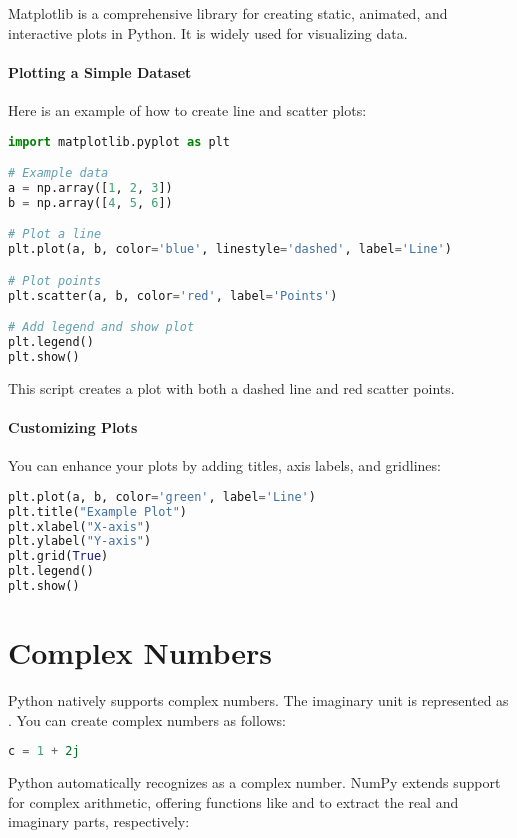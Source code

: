Matplotlib is a comprehensive library for creating static, animated, and interactive plots in Python. It is widely used for visualizing data.

\paragraph*{Plotting a Simple Dataset}

Here is an example of how to create line and scatter plots:

\begin{lstlisting}[language=Python, style=mystyle2]
import matplotlib.pyplot as plt

# Example data
a = np.array([1, 2, 3])
b = np.array([4, 5, 6])

# Plot a line
plt.plot(a, b, color='blue', linestyle='dashed', label='Line')

# Plot points
plt.scatter(a, b, color='red', label='Points')

# Add legend and show plot
plt.legend()
plt.show()
\end{lstlisting}

This script creates a plot with both a dashed line and red scatter points.

\paragraph*{Customizing Plots}

You can enhance your plots by adding titles, axis labels, and gridlines:

\begin{lstlisting}[language=Python, style=mystyle2]
plt.plot(a, b, color='green', label='Line')
plt.title("Example Plot")
plt.xlabel("X-axis")
plt.ylabel("Y-axis")
plt.grid(True)
plt.legend()
plt.show()
\end{lstlisting}

\section*{Complex Numbers}

Python natively supports complex numbers. The imaginary unit is represented as . You can create complex numbers as follows:

\begin{lstlisting}[language=Python, style=mystyle2]
c = 1 + 2j
\end{lstlisting}

Python automatically recognizes  as a complex number. NumPy extends support for complex arithmetic, offering functions like  and  to extract the real and imaginary parts, respectively:

